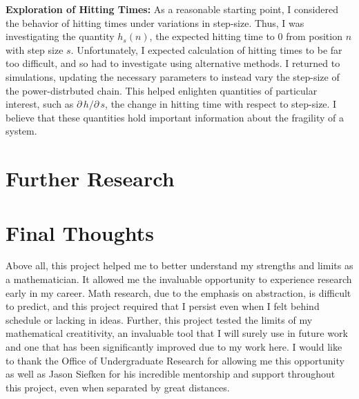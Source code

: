 \documentclass[12pt,letterpaper]{article}
\begin{document}
\noindent
\textbf{Exploration of Hitting Times:} As a reasonable starting point, I considered the behavior of
hitting times under variations in step-size. Thus, I was investigating the quantity $h_s(n)$, the
expected hitting time to $0$ from position $n$ with step size $s$. Unfortunately, I expected calculation
of hitting times to be far too difficult, and so had to investigate using alternative methods. I
returned to simulations, updating the necessary parameters to instead vary the step-size of the
power-distrbuted chain. This helped enlighten quantities of particular interest, such as $\partial\, h/
\partial\, s$, the change in hitting time with respect to step-size. I believe that these quantities
hold important information about the fragility of a system.



\section*{Further Research}

\section*{Final Thoughts}
Above all, this project helped me to better understand my strengths and limits as a mathematician. It
allowed me the invaluable opportunity to experience research early in my career. Math research, due to
the emphasis on abstraction, is difficult to predict, and this project required that I persist even when
I felt behind schedule or lacking in ideas. Further, this project tested the limits of my mathematical
creatitivity, an invaluable tool that I will surely use in future work and one that has been
significantly improved due to my work here. I would like to thank the Office of Undergraduate Research
for allowing me this opportunity as well as Jason Siefken for his incredible mentorship and support
throughout this project, even when separated by great distances.
\end{document}
